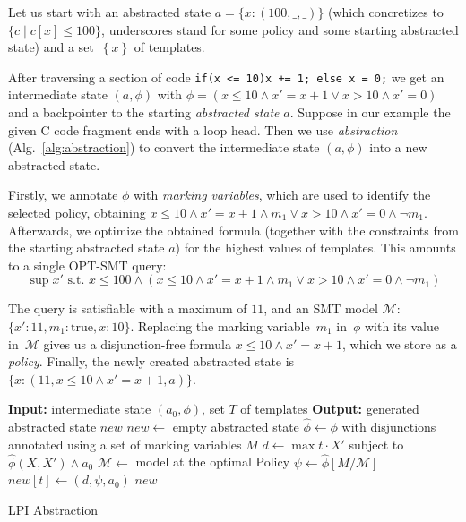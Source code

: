 \documentclass{llncs}
\newcommand{\setof}[1]{\ensuremath{\left \{{#1}\right\}}}
\newcommand{\tuple}[1]{\ensuremath{\left( #1 \right) }}
\begin{document}
\begin{example}
    Let us start with an abstracted state $a = \{x: \tuple{100, \_,
        \_}\}$ (which
    concretizes to $\{ c \mid c[x] \leq 100 \}$, underscores stand for some
    policy and some starting abstracted state) and a set~$\setof{x}$ of templates.

    After traversing a section of code
    \texttt{if(x <= 10){x += 1;} else {x = 0;}}
    we get an intermediate state $\tuple{a, \phi}$ with
    $\phi = (x \leq 10 \land x'=x+1 \lor x > 10 \land x'=0)$ and a backpointer
    to the starting \emph{abstracted state} $a$.
    Suppose in our example the given C code fragment ends with a loop head.
    Then we use \emph{abstraction} (Alg.~\ref{alg:abstraction}) to convert the intermediate state
    $\tuple{a, \phi}$ into a new abstracted state.

    Firstly, we annotate $\phi$ with \emph{marking variables}, which are used to
    identify the selected policy, obtaining $x \leq 10 \land x'=x+1 \land m_1 \lor x > 10
    \land x'=0 \land \lnot m_1$.
    Afterwards, we optimize the obtained formula (together with the constraints
    from the starting abstracted state $a$) for the highest values of templates.
    This amounts to a single OPT-SMT query: \[\sup{x'} \mbox{ s.t. } x \leq 100
    \land (x \leq 10 \land x'=x+1 \land m_1 \lor x > 10
    \land x'=0 \land \lnot m_1)\]

    The query is satisfiable with a maximum of $11$, and an SMT model
    $\mathcal{M}:$
    \mbox{$\{x':11, m_1: \mbox{true}, x:10\}$}.
    Replacing the marking variable~$m_1$ in~$\phi$ with its value
    in~$\mathcal{M}$ gives us a
    disjunction-free formula $x \leq 10 \land x'=x+1$,
    which we store as a \emph{policy}.
    Finally, the newly created abstracted state is $\{x: \tuple{11, x \leq 10
        \land x'=x+1, a }\}$.
\end{example}

\begin{algorithm}[t]
\begin{algorithmic}[1]
\State \textbf{Input: } intermediate state $\tuple{a_0, \phi}$, set $T$ of templates
\State \textbf{Output: } generated abstracted state $\mathit{new}$
\State $\mathit{new} \gets$ empty abstracted state
    \State $\hat{\phi} \gets \phi$ with disjunctions annotated using a set of
    marking variables $M$
    \State $d \gets \max{t \cdot X'}$ subject to $\hat{\phi}(X,X') \land a_0$
    \State $\mathcal{M} \gets$ model at the optimal
    \State Policy $\psi \gets \hat{\phi}[M/\mathcal{M}]$
    \State $\mathit{new}[t] \gets \tuple{d, \psi, a_0}$
\EndFor
\Return $\mathit{new}$
\end{algorithmic}
\caption{LPI Abstraction}
\label{alg:abstraction}
\end{algorithm}
\end{document}
